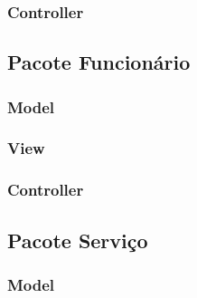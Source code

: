 \subsubsection{Controller}




\subsection{Pacote Funcionário}

\subsubsection{Model}




\subsubsection{View}



\subsubsection{Controller}




\subsection{Pacote Serviço}

\subsubsection{Model}



